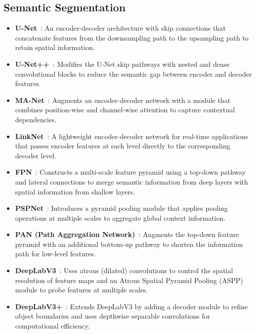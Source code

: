\subsection{Semantic Segmentation}
\begin{itemize}
	\item \textbf{U-Net}~\cite{ronneberger_u-net_2015}: An encoder-decoder architecture with skip connections that concatenate features from the downsampling path to the upsampling path to retain spatial information.

	\item \textbf{U-Net++}~\cite{zhou_unet_2018}: Modifies the U-Net skip pathways with nested and dense convolutional blocks to reduce the semantic gap between encoder and decoder features.

	\item \textbf{MA-Net}~\cite{fan_ma-net_2020}: Augments an encoder-decoder network with a module that combines position-wise and channel-wise attention to capture contextual dependencies.

	\item \textbf{LinkNet}~\cite{chaurasia_linknet_2017}: A lightweight encoder-decoder network for real-time applications that passes encoder features at each level directly to the corresponding decoder level.

	\item \textbf{FPN}~\cite{lin_feature_2017}: Constructs a multi-scale feature pyramid using a top-down pathway and lateral connections to merge semantic information from deep layers with spatial information from shallow layers.

	\item \textbf{PSPNet}~\cite{zhao_pyramid_2017}: Introduces a pyramid pooling module that applies pooling operations at multiple scales to aggregate global context information.

	\item \textbf{PAN (Path Aggregation Network)}~\cite{li_pyramid_2018}: Augments the top-down feature pyramid with an additional bottom-up pathway to shorten the information path for low-level features.

	\item \textbf{DeepLabV3}~\cite{chen_rethinking_2017}: Uses atrous (dilated) convolutions to control the spatial resolution of feature maps and an Atrous Spatial Pyramid Pooling (ASPP) module to probe features at multiple scales.

	\item \textbf{DeepLabV3+}~\cite{chen_encoder-decoder_2018}: Extends DeepLabV3 by adding a decoder module to refine object boundaries and uses depthwise separable convolutions for computational efficiency.


\end{itemize}
